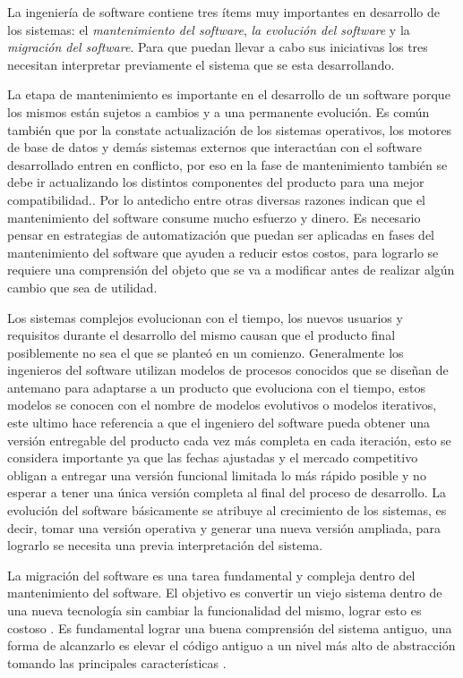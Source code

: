 \documentclass[12pt]{report}
\begin{document}
La ingeniería de software contiene tres ítems muy importantes en desarrollo de los sistemas: el \textit{mantenimiento del software}, \textit{la evolución del software} y la \textit{migración del software}. Para que puedan llevar a cabo sus iniciativas los tres necesitan interpretar previamente el sistema que se esta desarrollando.

La etapa de mantenimiento es importante en el desarrollo de un software porque los mismos están sujetos a cambios y a una permanente evolución\cite{PFT02}.
Es común también que por la constate actualización de los sistemas operativos, los motores de base de datos y demás sistemas externos que interactúan con el software desarrollado entren en conflicto, por eso en la fase de mantenimiento también se debe ir actualizando los distintos componentes del producto para una mejor compatibilidad.\cite{RSPMGH02}. Por lo antedicho entre otras diversas razones indican que el mantenimiento del software consume mucho esfuerzo y dinero. Es necesario pensar en estrategias de automatización que puedan ser aplicadas en fases del mantenimiento del software que ayuden a reducir estos costos, para lograrlo se requiere una comprensión del objeto que se va a modificar antes de realizar algún cambio que sea de utilidad.


Los sistemas complejos evolucionan con el tiempo, los nuevos usuarios y requisitos durante el desarrollo del mismo causan que el producto final posiblemente no sea el que se planteó en un comienzo. 
Generalmente los ingenieros del software utilizan modelos de procesos conocidos que se diseñan de antemano para adaptarse a un producto que evoluciona con el tiempo, estos modelos se conocen con el nombre de modelos evolutivos o modelos iterativos, este ultimo hace referencia a que el ingeniero del software pueda obtener una versión entregable del producto cada vez más completa en cada iteración, esto se considera importante ya que las fechas ajustadas y el mercado competitivo obligan a entregar una versión funcional limitada lo más rápido posible y no esperar a tener una única versión completa al final del proceso de desarrollo\cite{RSPMGH02}.
La evolución del software básicamente se atribuye al crecimiento de los sistemas, es decir, tomar una versión operativa y generar una nueva versión ampliada, para lograrlo se necesita una previa interpretación del sistema.


La migración del software es una tarea fundamental y compleja dentro del mantenimiento del software. El objetivo es convertir un viejo sistema dentro de una nueva tecnología sin cambiar la funcionalidad del mismo, lograr esto es costoso \cite{WHAFVR11}. Es fundamental lograr una buena comprensión del sistema antiguo, una forma de alcanzarlo es elevar el código antiguo a un nivel más alto de abstracción tomando las principales características \cite{MMFAF07}.
\end{document}
